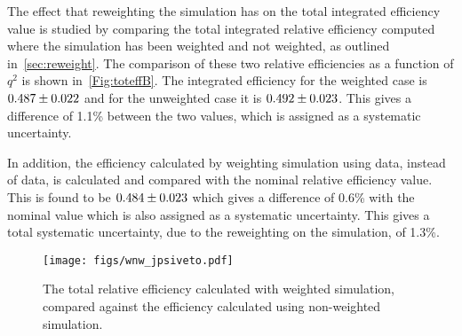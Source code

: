 The effect that reweighting the simulation has on the total integrated efficiency value is studied by comparing the total integrated relative efficiency computed where the simulation has been weighted and not weighted, as outlined in~\autoref{sec:reweight}. The comparison of these two relative efficiencies as a function of $q^{2}$ is shown in~\autoref{Fig:toteffB}. The integrated efficiency for the weighted case is $0.487\pm0.022$ and for the unweighted case it is $0.492\pm0.023$. This gives a difference of 1.1\% between the two values, which is assigned as a systematic uncertainty.

In addition, the efficiency calculated by weighting simulation using \LbKjpsi data, instead of \Lbpijpsi data, is calculated and compared with the nominal relative efficiency value. This is found to be $0.484\pm0.023$ which gives a difference of 0.6\% with the nominal value which is also assigned as a systematic uncertainty. This gives a total systematic uncertainty, due to the reweighting on the simulation, of 1.3\%.


\begin{figure}[h]
  \centering
  \texttt{[image: figs/wnw\_jpsiveto.pdf]}%
    \caption{ The total relative efficiency calculated with weighted simulation, compared against the efficiency calculated using non-weighted simulation.}
\label{Fig:toteffB}

\end{figure}




